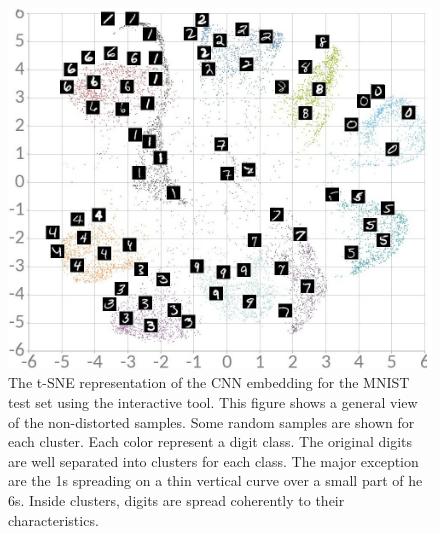 \documentclass[a4paper,12pt]{report}
\begin{document}
\begin{figure}[t]
    \centering
    \includegraphics[width=\textwidth]{thesis_figures/mnist_nda_tsne.jpg}
    \caption{The t-SNE representation of the CNN embedding for the MNIST test set using the interactive tool.
    This figure shows a general view of the non-distorted samples.
    Some random samples are shown for each cluster.
    Each color represent a digit class.
    The original digits are well separated into clusters for each class.
    The major exception are the 1s spreading on a thin vertical curve over a small part of he 6s.
    Inside clusters, digits are spread coherently to their characteristics.
    }
    \label{fig:mnist_nda_tsne}
\end{figure}
\end{document}
